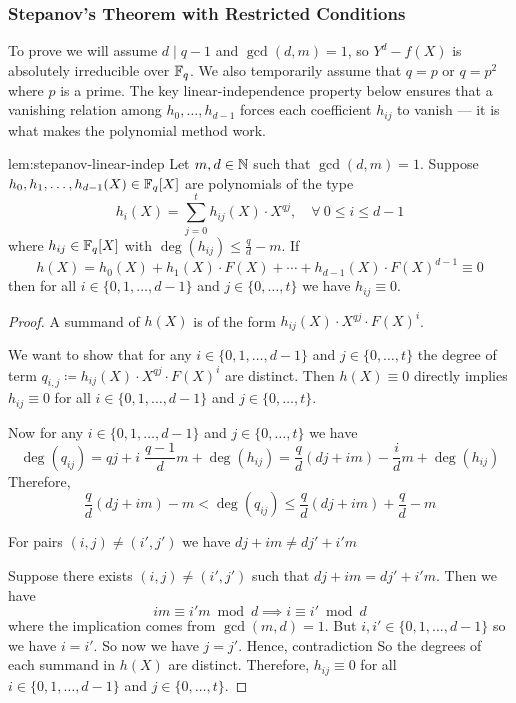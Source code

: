\subsubsection{Stepanov's Theorem with Restricted Conditions}
To prove \Stepanov we will assume $d\mid q-1$ and $\gcd(d,m)=1$, so $Y^d-f(X)$ is absolutely irreducible over $\mathbb{F}_q$. We also temporarily assume that $q=p$ or $q=p^2$ where $p$ is a prime.
The key linear-independence property below ensures that a vanishing relation among $h_0,\dots,h_{d-1}$ forces each coefficient $h_{ij}$ to vanish — it is what makes the polynomial method work.
\begin{lemma}{}{lem:stepanov-linear-indep}
  Let $m,d\in\mathbb{N}$ such that $\gcd(d,m)=1$. Suppose $h_0,h_1,\dots, h_{d-1}(X)\in\mathbb{F}_q[X]$ are polynomials of the type $$h_i(X)=\sum_{j=0}^th_{ij}(X)\cdot X^{qj},\quad \forall\ 0\leq i\leq d-1$$ where $h_{ij}\in\mathbb{F}_q[X]$ with $\deg(h_{ij})\leq \frac{q}{d}-m$. If $$h(X)=h_0(X)+h_1(X)\cdot F(X)+\cdots+h_{d-1}(X)\cdot F(X)^{d-1}\equiv 0$$ then for all $i\in\{0,1,\dots, d-1\}$ and $j\in\{0,\dots, t\}$ we have $h_{ij}\equiv 0$.
\end{lemma}
\begin{proof}
  A summand of $h(X)$ is of the form $h_{ij}(X)\cdot X^{qj}\cdot F(X)^i$. 

  \begin{want}
    We want to show that for any $i\in\{0,1,\dots, d-1\}$ and $j\in\{0,\dots, t\}$ the degree of term $q_{i,j}\coloneqq h_{ij}(X)\cdot X^{qj}\cdot F(X)^i$ are distinct. Then $h(X)\equiv 0$ directly implies $h_{ij}\equiv 0$ for all $i\in\{0,1,\dots, d-1\}$ and $j\in\{0,\dots, t\}$.
  \end{want}

  Now for any $i\in\{0,1,\dots, d-1\}$ and $j\in\{0,\dots, t\}$ we have $$\deg(q_{ij})=qj+i\;\frac{q-1}{d}m+\deg(h_{ij})=\frac{q}d(dj+im)-\frac{i}dm+\deg(h_{ij})$$Therefore, $$\frac{q}d(dj+im)-m<\deg(q_{ij})\leq \frac{q}d(dj+im)+\frac{q}d-m$$

  \begin{enough}
    For pairs $(i,j)\neq (i',j')$ we have $dj+im\neq dj'+i'm$
  \end{enough}

  Suppose there exists $(i,j)\neq (i',j')$ such that $dj+im=dj'+i'm$. Then we have $$im\equiv i'm\bmod d\implies i\equiv i'\bmod d$$where the implication comes from $\gcd(m,d)=1$. But $i,i'\in\{0,1,\dots, d-1\}$ so we have $i=i'$. So now we have $j=j'$. Hence, contradiction \ctr So the degrees of each summand in $h(X)$ are distinct. Therefore, $h_{ij}\equiv 0$ for all $i\in\{0,1,\dots, d-1\}$ and $j\in\{0,\dots, t\}$.
\end{proof}

